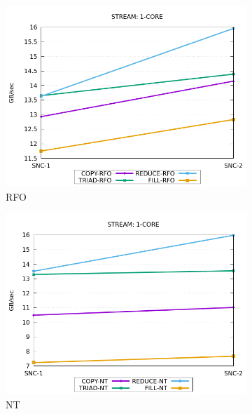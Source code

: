 \documentclass{article}
\begin{document}
\begin{figure}[!hb]
    \centering
    \begin{subfigure}[!hb]{0.3\textwidth}
         \centering
         \includegraphics[width=\textwidth]{../data/clx-8280l-snc/mem_bw_core/mb_core_rfo}
         \caption{RFO}
         \label{figure:mem_bw_core_rfo_clx_snc}
    \end{subfigure}
    \begin{subfigure}[!hb]{0.3\textwidth}
         \centering
         \includegraphics[width=\textwidth]{../data/clx-8280l-snc/mem_bw_core/mb_core_nt}
         \caption{NT}
         \label{figure:mem_bw_core_nt_clx_snc}
    \end{subfigure}
    \begin{subfigure}[!hb]{0.3\textwidth}

\end{subfigure}
\end{figure}
\end{document}
